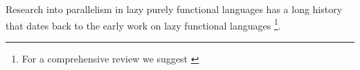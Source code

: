 Research into parallelism in lazy purely functional languages has a long
history that dates back to the early work on lazy functional languages
\citep{hughes:thesis, vGMachine, dutchBook, SPJ:PIFPL}\footnote{For a
comprehensive review we suggest \citep{hammond2000research}}. 
